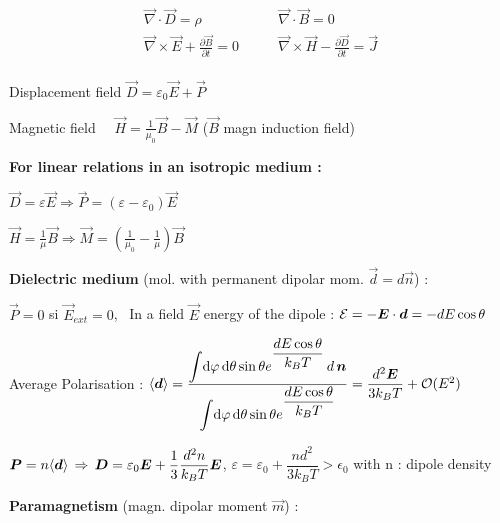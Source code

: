 \item[] $$\boxed{\begin{split}
	\vec{\nabla}\cdot\vec{D} = \rho  \qquad &\vec{\nabla} \cdot \vec{B} = 0\\
	\vec{\nabla}\times \vec{E} + \frac{\partial\vec{B}}{\partial t} = 0 \qquad & \vec{\nabla} \times \vec{H} - \frac{\partial \vec{D}}{\partial t} = \vec{J}\\
	\end{split}}$$
\item Displacement field $\vec{D}=\varepsilon_0\vec{E}+\vec{P} \quad $

\item Magnetic field $\quad \vec{H}=\frac{1}{\mu_0}\vec{B}-\vec{M}$ ($\vec{B}$ magn induction field)

\item[] \textbf{For linear relations in an isotropic medium :}
\item $\vec{D}=\varepsilon\vec{E}\Rightarrow\vec{P}=(\varepsilon-\varepsilon_0)\vec{E} \quad$ 

\item $\vec{H} = \frac{1}{\mu}\vec{B} \Rightarrow \vec{M} =  \left(\frac{1}{\mu_0} - \frac{1}{\mu}\right) \vec{B}$

\item[] \textbf{Dielectric medium} (mol. with permanent dipolar mom. $\vec{d} = d\vec{n}$) :

\item $\vec{P} = 0$ si $\vec{E}_{ext} =0$, \, In a field $\vec{E}$ energy of the dipole : $\mathcal{E} = -\mbox{\boldmath$E$}\cdot\mbox{\boldmath$d$} = - dE\cos\theta$\\

\item Average Polarisation : $\langle\mbox{\boldmath$d$}\rangle = \dfrac{\displaystyle{\int} \textrm{d} \varphi \, \textrm{d} \theta \sin\theta e^{\dfrac{d E \cos\theta}{k_BT}}\,d \,\mbox{\boldmath$n$}}{\displaystyle{\int} \textrm{d} \varphi \, \textrm{d} \theta \sin\theta e^{\dfrac{d E \cos\theta}{k_B T}}} = \dfrac{d^2 \mbox{\boldmath$E$}}{3k_BT} + \mathcal{O}(E^2) $

\item $\mbox{\boldmath$P$} = n\langle\mbox{\boldmath$d$}\rangle \, \Rightarrow \, \mbox{\boldmath$D$} = \varepsilon_0 \mbox{\boldmath$E$} + \dfrac{1}{3} \dfrac{d^2 n}{k_B T}\mbox{\boldmath$E$}$, $\varepsilon = \varepsilon_0 + \dfrac{nd^2}{3k_B T} > \epsilon_0$ with n : dipole density


\item[] \textbf{Paramagnetism} (magn. dipolar moment $\vec{m}$) :

